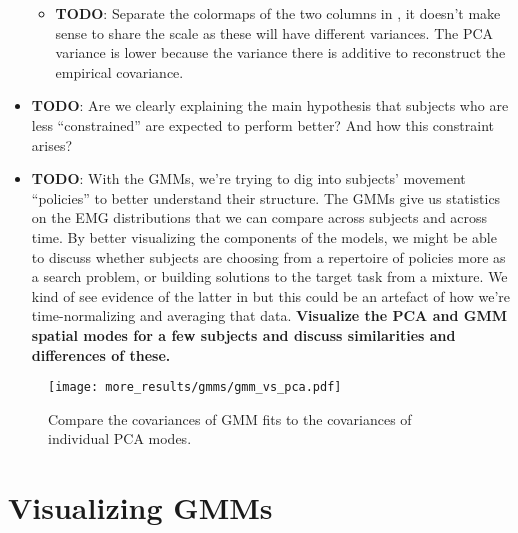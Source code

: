\documentclass[../main.tex]{subfiles}
\begin{document}
\begin{itemize}
\begin{itemize}
    \item \textbf{TODO}: Separate the colormaps of the two columns in , it doesn't make sense to share the scale as these will have different variances. The PCA variance is lower because the variance there is additive to reconstruct the empirical covariance.
  \end{itemize}
  \item \textbf{TODO}: Are we clearly explaining the main hypothesis that subjects who are less ``constrained'' are expected to perform better? And how this constraint arises?
  \item \textbf{TODO}: With the GMMs, we're trying to dig into subjects' movement ``policies'' to better understand their structure. The GMMs give us statistics on the EMG distributions that we can compare across subjects and across time. By better visualizing the components of the models, we might be able to discuss whether subjects are choosing from a repertoire of policies more as a search problem, or building solutions to the target task from a mixture. We kind of see evidence of the latter in  but this could be an artefact of how we're time-normalizing and averaging that data. \textbf{Visualize the PCA and GMM spatial modes for a few subjects and discuss similarities and differences of these.}
\end{itemize}



\begin{figure}[H]%
  \centering
    \texttt{[image: more\_results/gmms/gmm\_vs\_pca.pdf]}
    \caption[GMMs and PCA Covariance]{Compare the covariances of GMM fits to the covariances of individual PCA modes.}\label{fig:gmm_vs_pca}
\end{figure}



\section{Visualizing GMMs}
\end{document}
